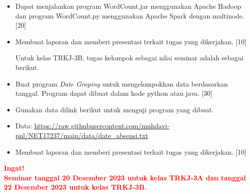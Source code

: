 \documentclass[a4paper]{tufte-handout}
\begin{document}
\begin{itemize}
\item Dapat menjalankan program WordCount.jar menggunakan Apache Hadoop dan program WordCount.py menggunakan Apache Spark dengan multinode. [20]
\item Membuat laporan dan memberi presentasi terkait tugas yang dikerjakan. [10]


Untuk kelas TRKJ-3B, tugas kelompok sebagai nilai seminar adalah sebagai berikut.
\item Buat program \textit{Date Groping} untuk mengelompokkan data berdasarkan tanggal. Program dapat dibuat dalam kode python atau java. [30]
\item Gunakan data dilink berikut untuk menguji program yang dibuat. 
\item Data: \url{https://raw.githubusercontent.com/muhdavi-pnl/NET17237/main/data/date_absensi.txt}
\item Membuat laporan dan memberi presentasi terkait tugas yang dikerjakan. [10]
\end{itemize}

\hrulefill

\begin{center}
\noindent
\textbf{\textcolor{red}{Ingat!\\ Seminar tanggal 20 Desember 2023 untuk kelas TRKJ-3A dan tanggal 22 Desember 2023 untuk kelas TRKJ-3B.}}
\end{center}

\hrulefill


\clearpage


\end{document}
